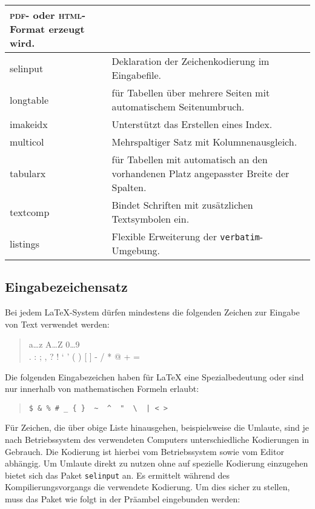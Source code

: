 \begin{longtable}[c]{@{}>{\raggedright\arraybackslash\ttfamily}p{2.2cm}%
                         p{}@{}}
 \textsc{pdf}- oder \textsc{html}-Format erzeugt wird.
\\\midrule
 selinput & 
 Deklaration der Zeichenkodierung im Eingabefile.
\\\midrule
 longtable &
 für Tabellen über mehrere Seiten mit automatischem Seitenumbruch.
\\\midrule
 imakeidx & 
 Unterstützt das Erstellen eines Index.
\\\midrule
 multicol & 
 Mehrspaltiger Satz mit Kolumnenausgleich.
\\\midrule
 tabularx & 
 für Tabellen mit automatisch an den vorhandenen Platz angepasster Breite der 
 Spalten.
\\\midrule
 textcomp & 
 Bindet Schriften mit zusätzlichen Textsymbolen ein.
 \\\midrule
 listings & Flexible Erweiterung der \texttt{verbatim}-Umgebung.
\\\bottomrule
\end{longtable}


\subsection{Eingabezeichensatz}\label{inputenc}

Bei jedem \LaTeX-System dürfen mindestens die folgenden Zeichen zur Eingabe von 
Text verwendet werden:
\begin{quote}
  \ttfamily
  a\dots z A\dots Z 0\dots 9 \\
  . : ; , ? ! ` ' ( ) [ ] - / * @ + =
\end{quote}
Die folgenden Eingabezeichen haben für \LaTeX{} eine Spezialbedeutung oder sind 
nur innerhalb von mathematischen Formeln erlaubt:
\begin{quote}
\lstinline.$ & % # _ { }  ~  ^  "  \  | < >.
\end{quote}
Für Zeichen, die über obige Liste hinausgehen, beispielsweise die Umlaute, sind 
je nach Betriebssystem des verwendeten Computers unterschiedliche Kodierungen in
Gebrauch. Die Kodierung ist hierbei vom Betriebssystem sowie vom Editor 
abhängig. Um Umlaute direkt zu nutzen ohne auf spezielle Kodierung einzugehen
bietet sich das Paket \texttt{selinput} an. Es ermittelt während des 
Kompilierungsvorgangs die verwendete Kodierung. Um dies sicher zu stellen, muss
das Paket wie folgt in der Präambel eingebunden werden:
\begin{example}[caption={Bestimmung der Kodierung für die Nutzung von Umlauten},]
 \usepackage{selinput}
 \usepackage[T1]{fontenc}%
\end{example}

